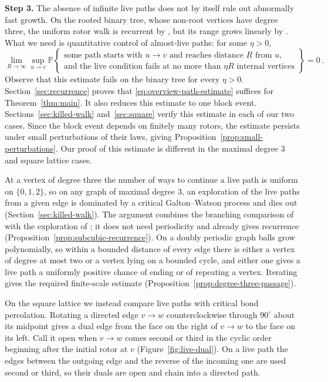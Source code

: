 \documentclass[11pt]{amsart}
\theoremstyle{plain}
\theoremstyle{definition}
\renewcommand{\P}{\mathbb P}
\begin{document}
	
	\medskip 
	\noindent\textbf{Step 3.}  The absence of infinite live paths does not by
	itself rule out abnormally fast growth.  On the rooted binary tree, whose
	non-root vertices have degree three, the uniform rotor walk is recurrent by
	\citet{AngelHolroyd2011}, but its range grows linearly by
	\citet[Theorem~1.1]{HussSavaHuss2020Range}.  What we need is quantitative
	control of almost-live paths: for some $\eta>0$,
	\begin{equation}\label{eq:overview-path-estimate}
		\lim_{R\to\infty}\sup_{u\to v}
		\P\left\{
		\begin{array}{c}
			\text{some path starts with $u\to v$ and reaches distance $R$ from $u$,}\\
			\text{and the live condition fails at no more than $\eta R$ internal vertices}
		\end{array}
		\right\}=0\, .
	\end{equation}
	Observe that this estimate fails on the binary tree for every $\eta>0$.  
	Section~\ref{sec:recurrence} proves that \eqref{eq:overview-path-estimate}
	suffices for Theorem~\ref{thm:main}.  It also reduces this estimate to one
	block event. Sections~\ref{sec:killed-walk} and~\ref{sec:square} verify this estimate 
	in each of our two cases.  Since the block event depends on finitely many rotors, the estimate
	persists under small perturbations of their laws, giving
	Proposition~\ref{prop:small-perturbations}. Our proof of this estimate is different in the maximal degree 3 and square lattice cases. 
	
	At a vertex of degree three the number of ways to continue a live path is
	uniform on $\{0,1,2\}$, so on any graph of maximal degree 3, an exploration of the live paths from a given
	edge is dominated by a critical Galton--Watson process and dies out
	(Section~\ref{sec:killed-walk}).  The argument combines the branching
	comparison of \citet{AngelHolroyd2011} with the exploration of
	\citet[Theorem~1]{BenjaminiSchramm1996}; it does not need periodicity and
	already gives recurrence (Proposition~\ref{prop:subcubic-recurrence}).
	On a doubly periodic graph balls grow polynomially, so within a bounded
	distance of every edge there is either a vertex of degree at most two or a
	vertex lying on a bounded cycle, and either one gives a live path a uniformly positive chance of ending or of
	repeating a vertex.  Iterating gives the required finite-scale estimate
	(Proposition~\ref{prop:degree-three-passage}).
	
	
	On the square lattice we instead compare live paths with critical bond
	percolation.
	Rotating a directed edge $v\to w$ counterclockwise through $90^\circ$ about its
	midpoint gives a dual edge from the face on the right of $v\to w$ to the face
	on its left.  Call it open when $v\to w$ comes second or third in the cyclic
	order beginning after the initial rotor at $v$
	(Figure~\ref{fig:live-dual}).  On a live path the edges between the outgoing
	edge and the reverse of the incoming one are used second or third, so their
	duals are open and chain into a directed path.
	
\end{document}

